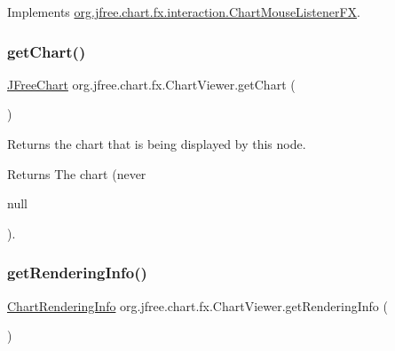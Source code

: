 Implements \mbox{\hyperlink{interfaceorg_1_1jfree_1_1chart_1_1fx_1_1interaction_1_1_chart_mouse_listener_f_x_aaf568a1fc8349de289cc6dbc39a277c2}{org.\+jfree.\+chart.\+fx.\+interaction.\+Chart\+Mouse\+Listener\+FX}}.

\mbox{\label{classorg_1_1jfree_1_1chart_1_1fx_1_1_chart_viewer_a1a140802ca5d675540bc2c71e39e2951}} 
\subsubsection{\texorpdfstring{get\+Chart()}{getChart()}}
{\footnotesize\ttfamily \mbox{\hyperlink{classorg_1_1jfree_1_1chart_1_1_j_free_chart}{J\+Free\+Chart}} org.\+jfree.\+chart.\+fx.\+Chart\+Viewer.\+get\+Chart (\begin{DoxyParamCaption}{ }\end{DoxyParamCaption})}

Returns the chart that is being displayed by this node.

\begin{DoxyReturn}{Returns}
The chart (never
\begin{DoxyCode}
null 
\end{DoxyCode}
 ). 
\end{DoxyReturn}
\mbox{\label{classorg_1_1jfree_1_1chart_1_1fx_1_1_chart_viewer_a0653c2a9d83917a2f4d948f45a54f005}} 
\subsubsection{\texorpdfstring{get\+Rendering\+Info()}{getRenderingInfo()}}
{\footnotesize\ttfamily \mbox{\hyperlink{classorg_1_1jfree_1_1chart_1_1_chart_rendering_info}{Chart\+Rendering\+Info}} org.\+jfree.\+chart.\+fx.\+Chart\+Viewer.\+get\+Rendering\+Info (\begin{DoxyParamCaption}{ }\end{DoxyParamCaption})}


